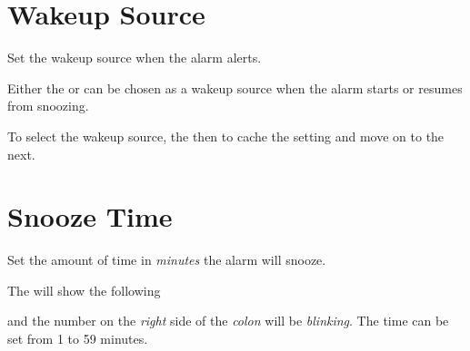 \section{Wakeup Source} 

Set the wakeup source when the alarm alerts.

\par\medskip

Either the  or  can be chosen as a wakeup source when the alarm
starts or resumes from snoozing. 


To select the wakeup source,  the  then 
to cache the setting and move on to the next.


\section{Snooze Time} 

Set the amount of time in \textit{minutes} the alarm will snooze.

\par\medskip

The  will show the following


and the number on the \textit{right} side of the \textit{colon} will be
\textit{blinking}.  The time can be set from \num{1} to \num{59} minutes.

\par\medskip

